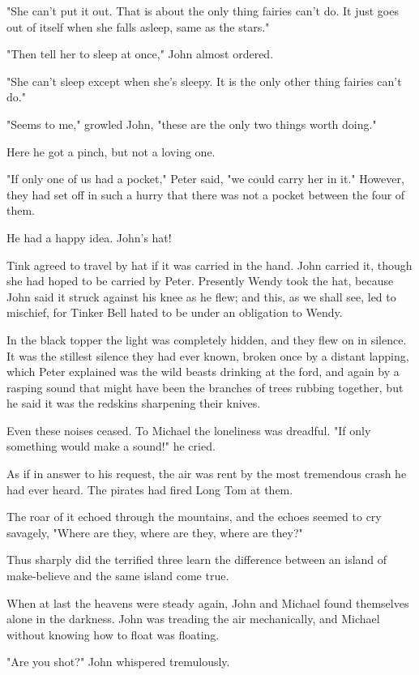 "She can't put it out.
That is about the only thing fairies can't do.
It just goes out of itself when she falls asleep, same as the stars."

"Then tell her to sleep at once," John almost ordered.

"She can't sleep except when she's sleepy.
It is the only other thing fairies can't do."

"Seems to me," growled John, "these are the only two things worth doing."

Here he got a pinch, but not a loving one.

"If only one of us had a pocket," Peter said, "we could carry her in it."
However, they had set off in such a hurry that there was not a pocket between the four of them.

He had a happy idea.
John's hat!

Tink agreed to travel by hat if it was carried in the hand.
John carried it, though she had hoped to be carried by Peter.
Presently Wendy took the hat, because John said it struck against his knee as he flew;
and this, as we shall see, led to mischief,
for Tinker Bell hated to be under an obligation to Wendy.

In the black topper the light was completely hidden, and they flew on in silence.
It was the stillest silence they had ever known, broken once by a distant lapping,
which Peter explained was the wild beasts drinking at the ford,
and again by a rasping sound that might have been the branches of trees rubbing together,
but he said it was the redskins sharpening their knives.

Even these noises ceased.
To Michael the loneliness was dreadful.
"If only something would make a sound!\@" he cried.

As if in answer to his request, the air was rent by the most tremendous crash he had ever heard.
The pirates had fired Long Tom at them.

The roar of it echoed through the mountains,
and the echoes seemed to cry savagely, "Where are they, where are they, where are they?"

Thus sharply did the terrified three learn the difference
between an island of make-believe and the same island come true.

When at last the heavens were steady again,
John and Michael found themselves alone in the darkness.
John was treading the air mechanically, and Michael without knowing how to float was floating.

"Are you shot?\@" John whispered tremulously.

